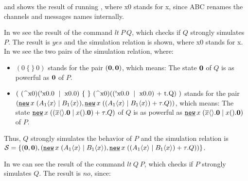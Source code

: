  and  shows the result of running , where x0 stands for x, since ABC renames the channels and messages names internally.

In  we see the result of the command $lt\ P\ Q$, which checks if $Q$ strongly simulates $P$. The result is $yes$ and the simulation relation is shown, where x0 stands for x. In  we see the two pairs of the simulation relation, where:
\begin{itemize}
\item $(0\ \{\ \}\ 0)$ stands for the pair $(\mathbf{0},\mathbf{0})$, which means: The state $\mathbf{0}$ of $Q$ is as powerful as  $\mathbf{0}$ of $P$.
\item $(\ (\ \widehat{}\ \text{x0})(\text{\textquotesingle x0.0}\ \mid\ \text{x0.0})\ \{\ \}\ (\ \widehat{}\ \text{x0})((\text{\textquotesingle x0.0}\ \mid\ \text{x0.0}) \text{ + t.Q} )\ )$ stands for the pair $(\procres{x}{(\procpar{\proccall{A_1}{x}}{\proccall{B_1}{x}})},\procres{x}{(\procchoice{(\procpar{\proccall{A_1}{x}}{\proccall{B_1}{x}})}{\tau.Q})})$, which means: The state $\procres{x}{(\procchoice{(\procpar{\out{x}{}.\proczero}{\inp{x}{}.\proczero})}{\tau.Q})}$ of $Q$ is as powerful as  $\procres{x}{(\procpar{\out{x}{}.\proczero}{\inp{x}{}.\proczero})}$ of $P$.

\end{itemize}

Thus, $Q$ strongly simulates the behavior of $P$ and the simulation relation is $\mathcal{S} = \set{(\proczero,\proczero),(\procres{x}{(\procpar{\proccall{A_1}{x}}{\proccall{B_1}{x}})},\procres{x}{(\procchoice{(\procpar{\proccall{A_1}{x}}{\proccall{B_1}{x}})}{\tau.Q})})}$.

In  we can see the result of the command $lt\ Q\ P$, which checks if $P$ strongly simulates $Q$. The result is $no$, since:

